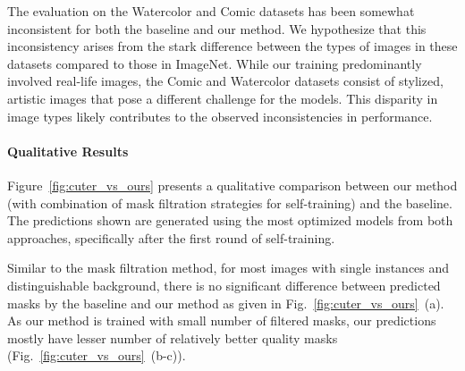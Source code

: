 The evaluation on the Watercolor and Comic datasets has been somewhat inconsistent for both the baseline and our method. We hypothesize that this inconsistency arises from the stark difference between the types of images in these datasets compared to those in ImageNet. While our training predominantly involved real-life images, the Comic and Watercolor datasets consist of stylized, artistic images that pose a different challenge for the models. This disparity in image types likely contributes to the observed inconsistencies in performance.

\paragraph{Qualitative Results}

Figure~\ref{fig:cuter_vs_ours} presents a qualitative comparison between our method (with combination of mask filtration strategies for self-training) and the baseline. The predictions shown are generated using the most optimized models from both approaches, specifically after the first round of self-training.

Similar to the mask filtration method, for most images with single instances and distinguishable background, there is no significant difference between predicted masks by the baseline and our method as given in Fig.~\ref{fig:cuter_vs_ours}~(a). As our method is trained with small number of filtered masks, our predictions mostly have lesser number of relatively better quality masks (Fig.~\ref{fig:cuter_vs_ours}~(b-c)). 

